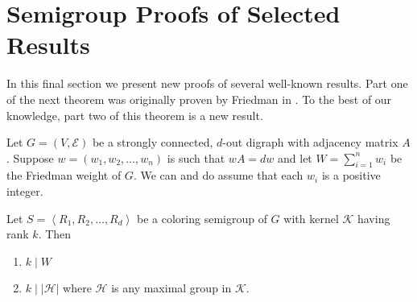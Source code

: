 

\section{Semigroup Proofs of Selected Results}
\label{sec:4.4}

In this final section we present new proofs of several well-known results.
Part one of the next theorem was originally proven by Friedman in \cite{F}. 
To the best of our knowledge, part two of this theorem is a new result.

\begin{theorem}		\label{thm:4.7}
Let $G=(V,\mathcal{E})$ be a strongly connected, $d$-out digraph with adjacency matrix $A$. 
Suppose $w=\left( w_1,w_2,\dots,w_n\right) $ is such that $wA=dw$ and let $W=\sum\limits_{i=1}^nw_i$ be the Friedman weight of $G$. 
We can and do assume that each $w_i$ is a positive integer.

Let $S=\left\langle R_1,R_2,\dots,R_d\right\rangle$ be a coloring semigroup
of $G$ with kernel $\mathcal{K}$ having rank $k$. 
Then 
%
\begin{enumerate}
\item[{\normalfont(1)}] $k\mid W$

\item[{\normalfont(2)}] $k\mid |\mathcal{H}|$ where $\mathcal{H}$ is any maximal group in $\mathcal{K}$.
\end{enumerate}
%
\end{theorem}

